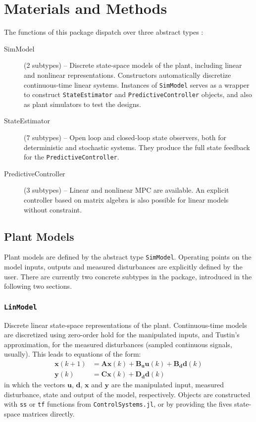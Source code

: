 
\section{Materials and Methods}

The functions of this package dispatch over three abstract types :
\begin{description}
    \item[SimModel] (2 subtypes) -- Discrete state-space models of the plant, including linear and nonlinear representations. Constructors automatically discretize 
    continuous-time linear systems. Instances of \texttt{SimModel} serves as a wrapper to construct \texttt{StateEstimator} and \texttt{PredictiveController} objects, and also as plant simulators to test the designs.
    \item[StateEstimator] (7 subtypes) -- Open loop and closed-loop state observers, both for deterministic and stochastic systems. They produce the full state feedback for the \texttt{PredictiveController}.
    \item[PredictiveController] (3 subtypes) -- Linear and nonlinear MPC are available. An explicit controller based on matrix algebra is also possible for linear models without constraint.
\end{description}

\subsection{Plant Models}

Plant models are defined by the abstract type \texttt{SimModel}. Operating points on the model inputs, outputs and measured disturbances are explicitly defined by the user. There are currently two concrete subtypes in the package, introduced in the following two sections.

\subsubsection{\textnormal{\texttt{LinModel}}}

Discrete linear state-space representations of the plant. Continuous-time models are discretized using zero-order hold for the manipulated inputs, and Tustin's approximation, for the measured disturbances (sampled continuous signals, usually). This leads to equations of the form:
\begin{subequations}
\begin{align}
    \mathbf{x}(k+1) &= \mathbf{A x}(k) + \mathbf{B_u u}(k) + \mathbf{B_d d}(k) \\
    \mathbf{y}(k)   &= \mathbf{C x}(k) + \mathbf{D_d d}(k)
\end{align}
\end{subequations}
in which the vectors $\mathbf{u}$, $\mathbf{d}$, $\mathbf{x}$ and $\mathbf{y}$ are the manipulated input, measured disturbance, state and output of the model, respectively. Objects are constructed with \texttt{ss} or \texttt{tf} functions from \texttt{ControlSystems.jl}, or by providing the fives state-space matrices directly.

